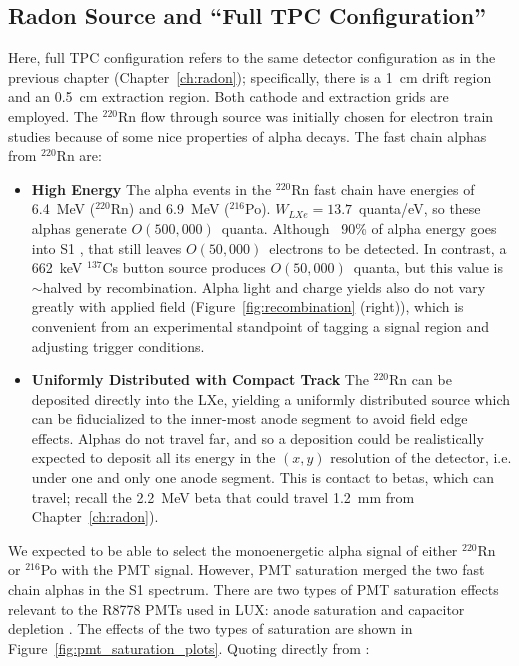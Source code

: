\subsection{Radon Source and ``Full TPC Configuration''}
Here, full \ac{TPC} configuration refers to the same detector configuration as in the previous chapter (Chapter~\ref{ch:radon}); specifically, there is a 1~cm drift region and an 0.5~cm extraction region. Both cathode and extraction grids are employed. The $^{220}$Rn flow through source was initially chosen for electron train studies because of some nice properties of alpha decays. The fast chain alphas from $^{220}$Rn are:

\begin{itemize}
\item \textbf{High Energy} The alpha events in the $^{220}$Rn fast chain have energies of 6.4~MeV ($^{220}$Rn)  and 6.9~MeV ($^{216}$Po). $W_{LXe} = 13.7$~quanta/eV, so these alphas generate $O(500,000)$~quanta. Although ~90\% of alpha energy goes into S1 \cite{Aprile2010}, that still leaves $O(50,000)$~electrons to be detected. In contrast, a 662~keV $^{137}$Cs button source produces $O(50,000)$~quanta, but this value is $\sim$halved by recombination. Alpha light and charge yields also do not vary greatly with applied field (Figure~\ref{fig:recombination} (right)), which is convenient from an experimental standpoint of tagging a signal region and adjusting trigger conditions.  
\item \textbf{Uniformly Distributed with Compact Track} The $^{220}$Rn can be deposited directly into the \ac{LXe}, yielding a uniformly distributed source which can be fiducialized to the inner-most anode segment to avoid field edge effects. Alphas do not travel far, and so a deposition could be realistically expected to deposit all its energy in the $(x,y)$ resolution of the detector, i.e. under one and only one anode segment. This is contact to betas, which can travel; recall the 2.2~MeV beta that could travel 1.2~mm from Chapter~\ref{ch:radon}).
\end{itemize}

We expected to be able to select the monoenergetic alpha signal of either $^{220}$Rn or $^{216}$Po with the \ac{PMT} signal. However, \ac{PMT} saturation merged the two fast chain alphas in the S1 spectrum. There are two types of \ac{PMT} saturation effects relevant to the R8778 \ac{PMT}s used in \ac{LUX}: anode saturation and capacitor depletion \cite{Faham2014a}. The effects of the two types of saturation are shown in Figure~\ref{fig:pmt_saturation_plots}. Quoting directly from \cite{Faham2014a}:

